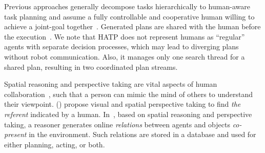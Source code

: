 \documentclass[letterpaper]{article} %
\begin{document}
Previous approaches generally decompose tasks hierarchically to human-aware task planning and assume a fully controllable and cooperative human willing to achieve a joint-goal together~\cite{alami2006toward,montreuil2007planning,alili2009planning,alili2009task,lallement2014hatp,de2015hatp,lallement2018hatp}. 
Generated plans are shared with the human before the execution~\cite{milliez2016using}.
We note that HATP does not represent humans as ``regular'' agents with separate decision processes, which may lead to diverging plans without robot communication.
Also, it manages only one search thread for a shared plan, resulting in two coordinated plan streams. 


Spatial reasoning and perspective taking are vital aspects of human collaboration~\cite{flavell1992perspectives,tversky1999speakers}, such that a person can mimic the mind of others to understand their viewpoint. 
% 
\citeauthor{milliez2014framework} (\citeyear{milliez2014framework}) propose visual and spatial perspective taking to find {\em the referent} indicated by a human. 
In~\cite{Sisbot2011SituationAF}, based on spatial reasoning and perspective taking, a reasoner generates online \textit{relations} between agents and objects {\em co-present} in the environment. 
Such relations are stored in a database and used for either planning, acting, or both.
\end{document}
